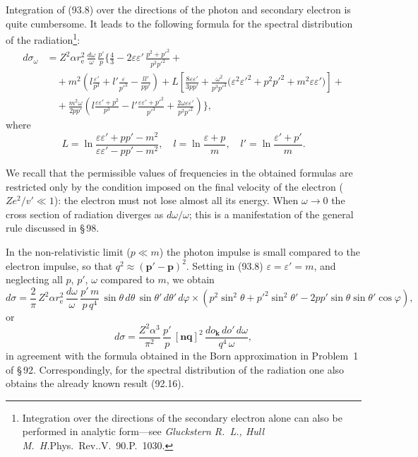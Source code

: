 Integration of (93.8) over the directions of the photon and secondary electron is quite cumbersome. It leads to the following formula for the spectral distribution of the radiation\footnote{Integration over the directions of the secondary electron alone can also be performed in analytic form---see \emph{Gluckstern R.~L., Hull M.~H.}\/\/Phys.~Rev..\enspace V.~90.\enspace P.~1030.}:
\begin{equation}
\begin{split}
d\sigma_\omega &= Z^2\alpha r_\mathrm{e}^2\,\frac{d\omega}{\omega}\,\frac{p'}{p}\biggl\{\frac{4}{3} - 2\varepsilon\varepsilon'\,\frac{p^2 + p'^2}{p^2 p'^2} + {} \\
&\quad {} + m^2\!\left(l\frac{\varepsilon'}{p^3} + l'\frac{\varepsilon}{p'^3} - \frac{ll'}{pp'}\right) + L\!\left[\frac{8\varepsilon\varepsilon'}{3pp'} + \frac{\omega^2}{p^3 p'^3}\bigl(\varepsilon^2\varepsilon'^2 + p^2 p'^2 + m^2\varepsilon\varepsilon'\bigr)\right] + {} \\
&\quad {} + \frac{m^2\omega}{2pp'}\!\left(l\frac{\varepsilon\varepsilon' + p^2}{p^3} - l'\frac{\varepsilon\varepsilon' + p'^2}{p'^3} + \frac{2\omega\varepsilon\varepsilon'}{p^2 p'^2}\right)\!\biggr\},
\end{split}
\label{eq:93.9}
\end{equation}
where
\[
L = \ln\frac{\varepsilon\varepsilon' + pp' - m^2}{\varepsilon\varepsilon' - pp' - m^2}, \quad l = \ln\frac{\varepsilon + p}{m}, \quad l' = \ln\frac{\varepsilon' + p'}{m}.
\]

We recall that the permissible values of frequencies in the obtained formulas are restricted only by the condition imposed on the final velocity of the electron ($Ze^2/v' \ll 1$): the electron must not lose almost all its energy. When $\omega \to 0$ the cross section of radiation diverges as $d\omega/\omega$; this is a manifestation of the general rule discussed in \S\,98.


In the non-relativistic limit ($p \ll m$) the photon impulse is small compared to the electron impulse, so that $q^2 \approx (\mathbf{p}'-\mathbf{p})^2$. Setting in (93.8) $\varepsilon = \varepsilon' = m$, and neglecting all $p$, $p'$, $\omega$ compared to $m$, we obtain
\[
d\sigma = \frac{2}{\pi}\,Z^2\alpha r_\mathrm{e}^2\,\frac{d\omega}{\omega}\,\frac{p'\,m}{p\,q^4}\,\sin\theta\,d\theta\,\sin\theta'\,d\theta'\,d\varphi \times (p^2\sin^2\theta + p'^2\sin^2\theta' - 2pp'\sin\theta\sin\theta'\cos\varphi),
\]
or
\begin{equation}
d\sigma = \frac{Z^2\alpha^3}{\pi^2}\,\frac{p'}{p}\,[\mathbf{nq}]^2\,\frac{do_\mathbf{k}\,do'\,d\omega}{q^4\,\omega},
\label{eq:93.10}
\end{equation}
in agreement with the formula obtained in the Born approximation in Problem~1 of \S\,92. Correspondingly, for the spectral distribution of the radiation one also obtains the already known result (92.16).

